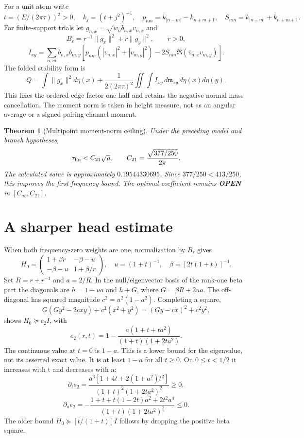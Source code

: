 \documentclass[11pt]{article}
\newtheorem{theorem}{Theorem}
\begin{document}
For a unit atom write
\[
 t=(E/(2\pi\tau))^2>0,\quad k_j=(t+j^2)^{-1},\quad
 p_{nm}=k_{|n-m|}-k_{n+m+1},\quad S_{nm}=k_{|n-m|}+k_{n+m+1}.
\]
For finite-support trials let $g_{n,x}=\sqrt{w_nb_{n,x}}v_{n,x}$ and
\[
 B_r=r^{-1}\|g_x\|^2+r\|g_y\|^2,\qquad r>0,
\]
\[
 I_{xy}=\sum_{n,m}b_{n,x}b_{m,y}
 [p_{nm}(|v_{n,x}|^2+|v_{m,y}|^2)-2S_{nm}\Re(\bar v_{n,x}v_{m,y})].
\]
The folded stability form is
\begin{equation}
 Q=\int\|g_x\|^2d\eta(x)+\frac1{2(2\pi\tau)^2}
 \iint\!\int I_{xy}\,d\mathfrak m_{xy}\,d\eta(x)d\eta(y).\label{eq:form}
\end{equation}
This fixes the ordered-edge factor one half and retains the negative normal mass cancellation. The moment norm is taken in height measure, not as an angular average or a signed pairing-channel moment.

\begin{theorem}[Multipoint moment-norm ceiling]
Under the preceding model and branch hypotheses,
\[
 \tau_{\rm lin}<C_{21}\sqrt\rho,\qquad C_{21}=\frac{\sqrt{377/250}}{2\pi}.
\]
The calculated value is approximately $0.19544330695$. Since $377/250<413/250$, this improves the first-frequency bound. The optimal coefficient remains \textbf{OPEN} in $[C_\infty,C_{21}]$.
\end{theorem}

\section{A sharper head estimate}
When both frequency-zero weights are one, normalization by $B_r$ gives
\[
 H_0=\begin{pmatrix}1+\beta r&-\beta-u\\-\beta-u&1+\beta/r\end{pmatrix},
 \quad u=(1+t)^{-1},\quad\beta=[2t(1+t)]^{-1}.
\]
Set $R=r+r^{-1}$ and $a=2/R$. In the null/eigenvector basis of the rank-one beta part the diagonals are $h=1-ua$ and $h+G$, where $G=\beta R+2ua$. The off-diagonal has squared magnitude $c^2=u^2(1-a^2)$. Completing a square,
\[
 G(Gy^2-2cxy)+c^2(x^2+y^2)=(Gy-cx)^2+c^2y^2,
\]
shows $H_0\succeq e_2I$, with
\begin{equation}
 e_2(r,t)=1-\frac{a(1+t+ta^2)}{(1+t)(1+2ta^2)}.\label{eq:head}
\end{equation}
The continuous value at $t=0$ is $1-a$. This is a lower bound for the eigenvalue, not its asserted exact value. It is at least $1-a$ for all $t\ge0$. On $0\le t<1/2$ it increases with t and decreases with a:
\[
 \partial_te_2=\frac{a^3[1+4t+2(1+a^2)t^2]}{(1+t)^2(1+2ta^2)^2}\ge0,
\]
\[
 \partial_ae_2=-\frac{1+t+t(1-2t)a^2+2t^2a^4}{(1+t)(1+2ta^2)^2}\le0.
\]
The older bound $H_0\succeq[t/(1+t)]I$ follows by dropping the positive beta square.
\end{document}
